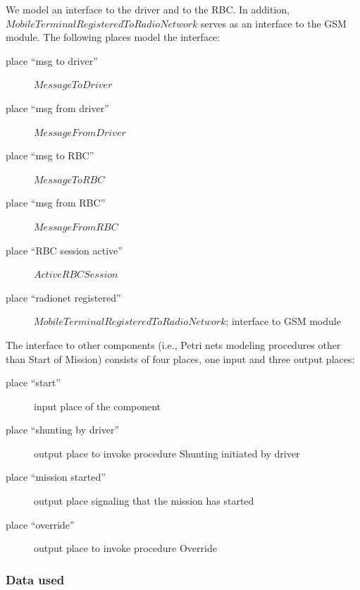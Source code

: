 \documentclass{template/openetcs_article}
\begin{document}
We model an interface to the driver and to the RBC. In addition, $\mathit{MobileTerminalRegisteredToRadioNetwork}$ serves as an interface to the GSM module. The following places model the interface:
\begin{description}
	\item[place ``msg to driver''] $\mathit{MessageToDriver}$
	\item[place ``msg from driver''] $\mathit{MessageFromDriver}$
	\item[place ``msg to RBC''] $\mathit{MessageToRBC}$
	\item[place ``msg from RBC''] $\mathit{MessageFromRBC}$
	\item[place ``RBC session active''] $\mathit{ActiveRBCSession}$
	\item[place ``radionet registered''] $\mathit{MobileTerminalRegisteredToRadioNetwork}$; interface to GSM module
\end{description}

The interface to other components (i.e., Petri nets modeling procedures other than Start of Mission) consists of four places, one input and three output places:
\begin{description}
	\item[place ``start''] input place of the component
	\item[place ``shunting by driver''] output place to invoke procedure Shunting initiated by driver
	\item[place ``mission started''] output place signaling that the mission has started
	\item[place ``override''] output place to invoke procedure Override
\end{description}

\subsubsection{Data used}
\end{document}

